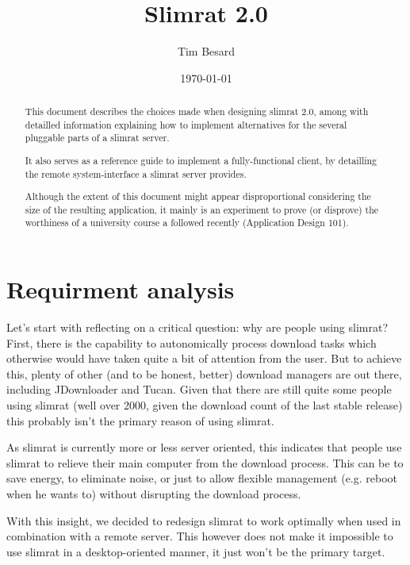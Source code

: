 \documentclass{article}
\makeatletter
\def\s@btitle{\relax}
\def\subtitle#1{\gdef\s@btitle{#1}}
\makeatother
\begin{document}
\title{Slimrat 2.0}
\subtitle{Design reference}
\author{Tim Besard}
\date{\today}
\maketitle

\parskip 7.2pt

\begin{abstract}
This document describes the choices made when designing slimrat 2.0, among with detailled information explaining how to implement alternatives for the several pluggable parts of a slimrat server.

It also serves as a reference guide to implement a fully-functional client, by detailling the remote system-interface a slimrat server provides.

\phantom{.}
Although the extent of this document might appear disproportional considering the size of the resulting application, it mainly is an experiment to prove (or disprove) the worthiness of a university course a followed recently (Application Design 101).
\end{abstract}

\newpage
\listoffigures


%
%

\newpage
\section{Requirment analysis}

Let's start with reflecting on a critical question: why are people using slimrat? First, there is the capability to autonomically process download tasks which otherwise would have taken quite a bit of attention from the user. But to achieve this, plenty of other (and to be honest, better) download managers are out there, including JDownloader and Tucan. Given that there are still quite some people using slimrat (well over 2000, given the download count of the last stable release) this probably isn't the primary reason of using slimrat.

As slimrat is currently more or less server oriented, this indicates that people use slimrat to relieve their main computer from the download process. This can be to save energy, to eliminate noise, or just to allow flexible management (e.g. reboot when he wants to) without disrupting the download process.

With this insight, we decided to redesign slimrat to work optimally when used in combination with a remote server. This however does not make it impossible to use slimrat in a desktop-oriented manner, it just won't be the primary target.
\end{document}
